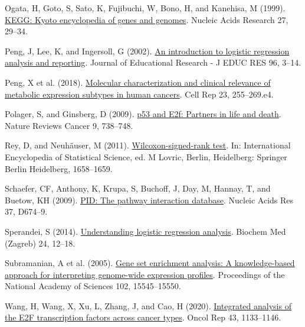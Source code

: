 \documentclass[
  parskip,
  oneside]{scrreprt}
\newlength{\cslhangindent}
\newlength{\cslentryspacingunit} %
\newenvironment{CSLReferences}[2] %
 {%
  \setlength{\parindent}{0pt}
  \ifodd #1
  \let\oldpar\par
  \def\par{\hangindent=\cslhangindent\oldpar}
  \fi
  \setlength{\parskip}{#2\cslentryspacingunit}
 }%
 {}
\begin{document}
\begin{CSLReferences}{0}{0}
\leavevmode{}%
Ogata, H, Goto, S, Sato, K, Fujibuchi, W, Bono, H, and Kanehisa, M
(1999). \href{https://doi.org/10.1093/nar/27.1.29}{KEGG: Kyoto
encyclopedia of genes and genomes}. Nucleic Acids Research 27, 29--34.

\leavevmode{}%
Peng, J, Lee, K, and Ingersoll, G (2002).
\href{https://doi.org/10.1080/00220670209598786}{An introduction to
logistic regression analysis and reporting}. Journal of Educational
Research - J EDUC RES 96, 3--14.

\leavevmode{}%
Peng, X et al. (2018).
\href{https://doi.org/10.1016/j.celrep.2018.03.077}{Molecular
characterization and clinical relevance of metabolic expression subtypes
in human cancers}. Cell Rep 23, 255--269.e4.

\leavevmode{}%
Polager, S, and Ginsberg, D (2009).
\href{https://doi.org/10.1038/nrc2718}{p53 and E2f: Partners in life and
death}. Nature Reviews Cancer 9, 738--748.

\leavevmode{}%
Rey, D, and Neuhäuser, M (2011).
\href{https://doi.org/10.1007/978-3-642-04898-2_616}{Wilcoxon-signed-rank
test}. In: International Encyclopedia of Statistical Science, ed. M
Lovric, Berlin, Heidelberg: Springer Berlin Heidelberg, 1658--1659.

\leavevmode{}%
Schaefer, CF, Anthony, K, Krupa, S, Buchoff, J, Day, M, Hannay, T, and
Buetow, KH (2009). \href{https://doi.org/10.1093/nar/gkn653}{PID: The
pathway interaction database}. Nucleic Acids Res 37, D674--9.

\leavevmode{}%
Sperandei, S (2014).
\href{https://doi.org/10.11613/BM.2014.003}{Understanding logistic
regression analysis}. Biochem Med (Zagreb) 24, 12--18.

\leavevmode{}%
Subramanian, A et al. (2005).
\href{https://doi.org/doi:10.1073/pnas.0506580102}{Gene set enrichment
analysis: A knowledge-based approach for interpreting genome-wide
expression profiles}. Proceedings of the National Academy of Sciences
102, 15545--15550.

\leavevmode{}%
Wang, H, Wang, X, Xu, L, Zhang, J, and Cao, H (2020).
\href{https://doi.org/10.3892/or.2020.7504}{Integrated analysis of the
E2F transcription factors across cancer types}. Oncol Rep 43,
1133--1146.


\end{CSLReferences}
\end{document}
